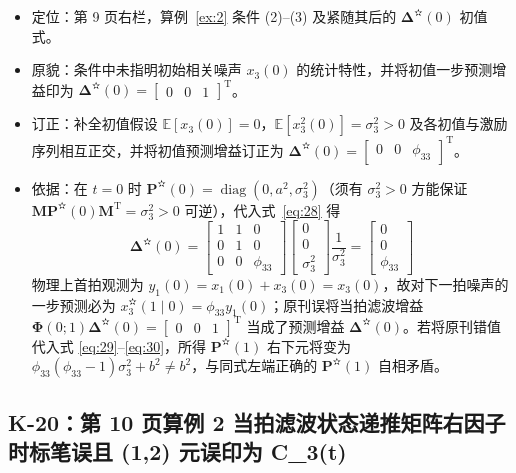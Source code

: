 \begin{itemize}
\item 定位：第 9 页右栏，算例~\ref{ex:2} 条件 (2)–(3) 及紧随其后的 $\bm{\Delta}^{\text{✫}}(0)$ 初值式。
\item 原貌：条件中未指明初始相关噪声 $x_3(0)$ 的统计特性，并将初值一步预测增益印为 $\bm{\Delta}^{\text{✫}}(0) = \begin{bmatrix} 0 & 0 & 1 \end{bmatrix}^{\mathrm{T}}$。
\item 订正：补全初值假设 $\mathbb{E}[x_3(0)] = 0$，$\mathbb{E}[x_3^2(0)] = \sigma_3^2 > 0$ 及各初值与激励序列相互正交，并将初值预测增益订正为 $\bm{\Delta}^{\text{✫}}(0) = \begin{bmatrix} 0 & 0 & \phi_{33} \end{bmatrix}^{\mathrm{T}}$。
\item 依据：在 $t = 0$ 时 $\bm{P}^{\text{✫}}(0) = \operatorname{diag}(0, a^2, \sigma_3^2)$（须有 $\sigma_3^2 > 0$ 方能保证 $\bm{M}\bm{P}^{\text{✫}}(0)\bm{M}^{\mathrm{T}} = \sigma_3^2 > 0$ 可逆），代入式~\eqref{eq:28} 得
\begin{equation*}
\bm{\Delta}^{\text{✫}}(0) = \begin{bmatrix} 1 & 1 & 0 \\ 0 & 1 & 0 \\ 0 & 0 & \phi_{33} \end{bmatrix} \begin{bmatrix} 0 \\ 0 \\ \sigma_3^2 \end{bmatrix} \frac{1}{\sigma_3^2} = \begin{bmatrix} 0 \\ 0 \\ \phi_{33} \end{bmatrix}
\end{equation*}
物理上首拍观测为 $y_1(0) = x_1(0) + x_3(0) = x_3(0)$，故对下一拍噪声的一步预测必为 $x_3^{\text{✫}}(1 \mid 0) = \phi_{33}y_1(0)$；原刊误将当拍滤波增益 $\bm{\Phi}(0; 1)\bm{\Delta}^{\text{✫}}(0) = \begin{bmatrix} 0 & 0 & 1 \end{bmatrix}^{\mathrm{T}}$ 当成了预测增益 $\bm{\Delta}^{\text{✫}}(0)$。若将原刊错值代入式 \eqref{eq:29}–\eqref{eq:30}，所得 $\bm{P}^{\text{✫}}(1)$ 右下元将变为 $\phi_{33}(\phi_{33} - 1)\sigma_3^2 + b^2 \neq b^2$，与同式左端正确的 $\bm{P}^{\text{✫}}(1)$ 自相矛盾。
\end{itemize}

\subsection{K-20：第 10 页算例 2 当拍滤波状态递推矩阵右因子时标笔误且 (1,2) 元误印为 C\_3(t)}\label{sec:k20}

